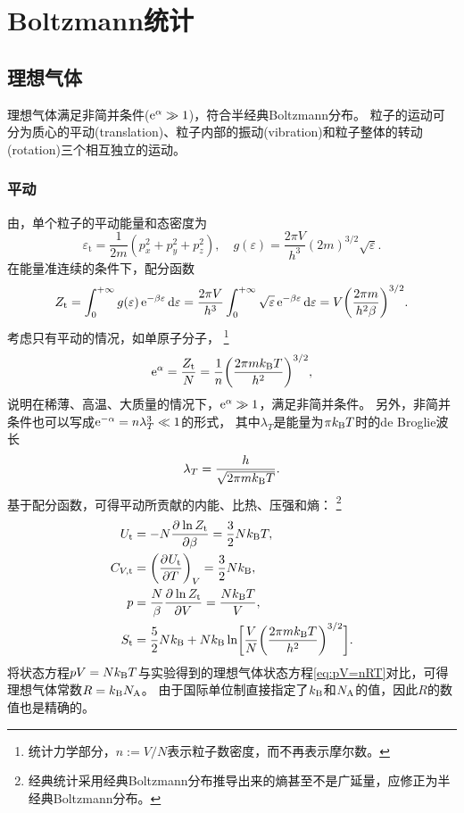 \newcommand*{\tl}{\mathrm t}  %
\newcommand*{\rt}{\mathrm r}  %
\newcommand*{\vb}{\mathrm v}  %

\chapter{Boltzmann统计}

\section{理想气体}
\label{sec:ideal gas}

理想气体满足非简并条件($\mathop{}\!\mathrm{e}^\alpha\gg 1$)，符合半经典Boltzmann分布。
粒子的运动可分为质心的平动(translation)、粒子内部的振动(vibration)和粒子整体的转动(rotation)三个相互独立的运动。

\subsection{平动}
\label{ssec:translation}

由，单个粒子的平动能量和态密度为
\[
	\varepsilon_\tl=\frac1{2m}(p_x^2+p_y^2+p_z^2),\quad g(\varepsilon)=\frac{2\pi V}{h^3}(2m)^{3/2}\sqrt\varepsilon.
\]
在能量准连续的条件下，配分函数
\begin{equation}
	Z_\tl=\int\zti g(\varepsilon)\e{-\beta\varepsilon}\d\varepsilon=\frac{2\pi V}{h^3}\int\zti\sqrt\varepsilon\e{-\beta\varepsilon}\d\varepsilon=V\biggkh{\frac{2\pi m}{h^2\beta}}^{3/2}.
\end{equation}
考虑只有平动的情况，如单原子分子，
\footnote{统计力学部分，$n:=V/N$表示粒子数密度，而不再表示摩尔数。}
\[
	\e{\alpha}=\frac{Z_\tl}N=\frac1n\biggkh{\frac{2\pi m\kB T}{h^2}}^{3/2},
\]
说明在稀薄、高温、大质量的情况下，$\mathop{}\!\mathrm{e}^\alpha\gg 1$，满足非简并条件。
另外，非简并条件也可以写成$\mathop{}\!\mathrm{e}^{-\alpha}=n\lambda_T^3\ll 1$的形式，
其中$\lambda_T$是能量为$\pi k_{\mathrm B} T$时的de Broglie波长
\begin{equation}
	\label{eq:de Broglie wavelength}
	\lambda_T=\frac{h}{\sqrt{2\pi mk_{\mathrm B} T}}.
\end{equation}
基于配分函数，可得平动所贡献的内能、比热、压强和熵：
\footnote{经典统计采用经典Boltzmann分布推导出来的熵甚至不是广延量，应修正为半经典Boltzmann分布。}
\begin{subequations}
	\begin{align}
		U_\tl&=-N\pv{\ln Z_\tl}\beta=\frac32N\kB T,\\
		C_{V,\tl}&=\pu[V]{U_\tl}T=\frac32N\kB,\\
		p&=\frac N\beta\pv{\ln Z_\tl}V=\frac{N\kB T}V,\\
		S_\tl
		&=\frac52N\kB+N\kB\ln\biggfkh{\frac VN\biggkh{\frac{2\pi m\kB T}{h^2}}^{3/2}}.
	\end{align}
\end{subequations}
将状态方程$pV=Nk_{\mathrm B} T$与实验得到的理想气体状态方程\eqref{eq:pV=nRT}对比，可得理想气体常数$R=k_{\mathrm B}N_{\mathrm A}$。
由于国际单位制直接指定了$k_{\mathrm B}$和$N_{\mathrm A}$的值，因此$R$的数值也是精确的。

